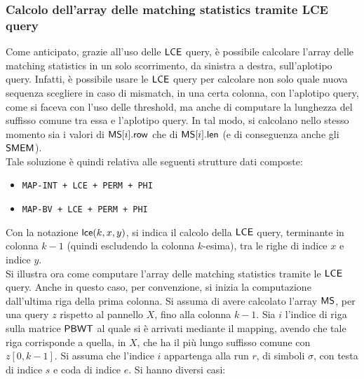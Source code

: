\subsubsection{Calcolo dell'array delle matching statistics tramite LCE query}
Come anticipato, grazie all'uso delle $\mbox{\rm {\sf LCE}}$ query, è possibile calcolare
l'array 
delle matching statistics in un solo scorrimento, da sinistra a
destra, sull'aplotipo query. Infatti, è possibile usare le $\mbox{\rm {\sf LCE}}$ query per
calcolare non solo quale 
nuova 
sequenza scegliere in caso di mismatch, in una certa colonna, con l'aplotipo
query, come 
si faceva con l'uso delle threshold, ma anche di computare la lunghezza
del suffisso comune tra essa e l'aplotipo query. In tal modo, si calcolano nello
stesso momento sia i valori di $\mbox{\rm {\sf MS}}[i].\mbox{\rm {\sf row}}$ che di $\mbox{\rm {\sf MS}}[i].\mbox{\rm {\sf len}}$ (e di
conseguenza anche gli $\mbox{\rm {\sf SMEM}}$).\\
Tale soluzione è quindi relativa alle seguenti strutture dati composte:
\begin{itemize}
  \item \texttt{MAP-INT + LCE + PERM + PHI}
  \item \texttt{MAP-BV + LCE + PERM + PHI}
\end{itemize}
Con la notazione $\mbox{\rm {\sf lce}}(k, x, y)$,
si indica il calcolo della $\mbox{\rm {\sf LCE}}$ query, terminante in colonna $k-1$ (quindi
escludendo la colonna 
$k$-esima), tra le righe di indice $x$ e
indice $y$.\\ 
Si illustra ora come computare l'array delle matching statistics tramite le
$\mbox{\rm {\sf LCE}}$ query. Anche
in questo caso, per convenzione, si inizia la computazione dall'ultima 
riga della prima colonna.
Si assuma di avere calcolato l'array $\mbox{\rm {\sf MS}}$, per una query $z$ rispetto al
pannello $X$, fino alla
colonna $k-1$. Sia $i$ 
l'indice di riga sulla matrice $\mbox{\rm {\sf PBWT}}$ al quale si è arrivati mediante il
mapping, avendo che tale riga corrisponde a quella, in $X$, che ha il più lungo
suffisso 
comune con 
$z[0,k-1]$. Si assuma che l'indice $i$ appartenga alla run $r$, di simboli
$\sigma$, con testa di indice $s$ e coda di indice $e$. Si hanno diversi casi:
